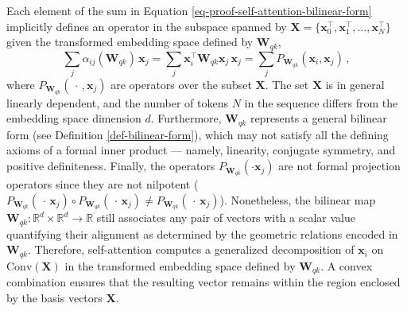 \begin{remark}
%
Each element of the sum in Equation \eqref{eq-proof-self-attention-bilinear-form} implicitly defines an operator in the subspace spanned by $\bm{X} = \{\bm{x}_0^\top, \bm{x}_1^\top, \dots, \bm{x}_N^\top\}$ given the transformed embedding space defined by $\bm{W}_{qk}$,
%
\begin{equation}
     \sum_j \alpha_{ij}(\bm{W}_{qk})\, \bm{x}_j = \sum_j \bm{x}_i^\top \bm{W}_{qk} \bm{x}_j\,\bm{x}_j = \sum_j P_{\bm{W}_{qk}}(\bm{x}_i ,\bm{x}_j)\,,
\end{equation}
%
where $P_{\bm{W}_{qk}}(\,\cdot\,, \bm{x}_j)$ are operators over the subset $\bm{X}$.
%
The set $\bm{X}$ is in general linearly dependent, and the number of tokens $N$ in the sequence differs from the embedding space dimension $d$.
%
Furthermore, $\bm{W}_{qk}$ represents a general bilinear form (see Definition \ref{def-bilinear-form}), which may not satisfy all the defining axioms of a formal inner product — namely, linearity, conjugate symmetry, and positive definiteness.
%
Finally, the operators $P_{\bm{W}_{qk}}(\cdot \bm{x}_j)$ are not formal projection operators since they are not nilpotent ($P_{\bm{W}_{qk}}(\,\cdot\, \bm{x}_j) \circ P_{\bm{W}_{qk}}(\,\cdot\, \bm{x}_j) \neq P_{\bm{W}_{qk}}(\,\cdot\, \bm{x}_j)$).
%
Nonetheless, the bilinear map $\bm{W}_{qk}: \mathbb{R}^d \times \mathbb{R}^d \rightarrow \mathbb{R}$ still associates any pair of vectors with a scalar value quantifying their alignment as determined by the geometric relations encoded in $\bm{W}_{qk}$.
Therefore, self-attention computes a generalized decomposition of $\bm{x}_i$ on $\text{Conv}(\bm{X})$ in the transformed embedding space defined by $\bm{W}_{qk}$.
%
A convex combination ensures that the resulting vector remains within the region enclosed by the basis vectors $\bm{X}$.
%  
\end{remark}